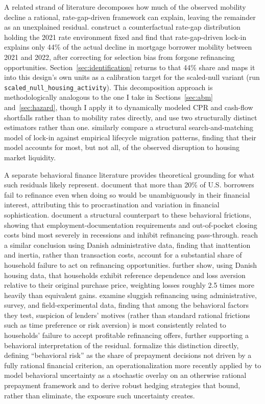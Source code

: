 \documentclass[12pt]{article}
\begin{document}
A related strand of literature decomposes how much of the observed mobility decline a rational, rate-gap-driven framework can explain, leaving the remainder as an unexplained residual. \citet{aladangady2024} construct a counterfactual rate-gap distribution holding the 2021 rate environment fixed and find that rate-gap-driven lock-in explains only 44\% of the actual decline in mortgage borrower mobility between 2021 and 2022, after correcting for selection bias from forgone refinancing opportunities. Section~\ref{sec:identification} returns to that 44\% share and maps it into this design's own units as a calibration target for the scaled-null variant (run \texttt{scaled\_null\_housing\_activity}). This decomposition approach is methodologically analogous to the one I take in Sections~\ref{sec:abm} and~\ref{sec:hazard}, though I apply it to dynamically modeled CPR and cash-flow shortfalls rather than to mobility rates directly, and use two structurally distinct estimators rather than one. \citet{gerardi2024} similarly compare a structural search-and-matching model of lock-in against empirical lifecycle migration patterns, finding that their model accounts for most, but not all, of the observed disruption to housing market liquidity.

A separate behavioral finance literature provides theoretical grounding for what such residuals likely represent. \citet{keys2016} document that more than 20\% of U.S. borrowers fail to refinance even when doing so would be unambiguously in their financial interest, attributing this to procrastination and variation in financial sophistication. \citet{defusco2020} document a structural counterpart to these behavioral frictions, showing that employment-documentation requirements and out-of-pocket closing costs bind most severely in recessions and inhibit refinancing pass-through. \citet{andersen2020} reach a similar conclusion using Danish administrative data, finding that inattention and inertia, rather than transaction costs, account for a substantial share of household failure to act on refinancing opportunities. \citet{andersen2022} further show, using Danish housing data, that households exhibit reference dependence and loss aversion relative to their original purchase price, weighting losses roughly 2.5 times more heavily than equivalent gains. \citet{johnson2019} examine sluggish refinancing using administrative, survey, and field-experimental data, finding that among the behavioral factors they test, suspicion of lenders' motives (rather than standard rational frictions such as time preference or risk aversion) is most consistently related to households' failure to accept profitable refinancing offers, further supporting a behavioral interpretation of the residual. \citet{bissiri2014} formalize this distinction directly, defining ``behavioral risk'' as the share of prepayment decisions not driven by a fully rational financial criterion, an operationalization more recently applied by \citet{perotti2024} to model behavioral uncertainty as a stochastic overlay on an otherwise rational prepayment framework and to derive robust hedging strategies that bound, rather than eliminate, the exposure such uncertainty creates.
\end{document}
